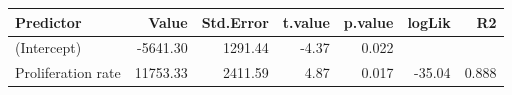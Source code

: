 \begin{table}[ht]
\centering
\begin{tabular}{lrrrrrr}
  \hline
Predictor & Value & Std.Error & t.value & p.value & logLik & R2 \\ 
  \hline
(Intercept) & -5641.30 & 1291.44 & -4.37 & 0.022 &  &  \\ 
  Proliferation rate & 11753.33 & 2411.59 & 4.87 & 0.017 & -35.04 & 0.888 \\ 
   \hline
\end{tabular}
\end{table}
